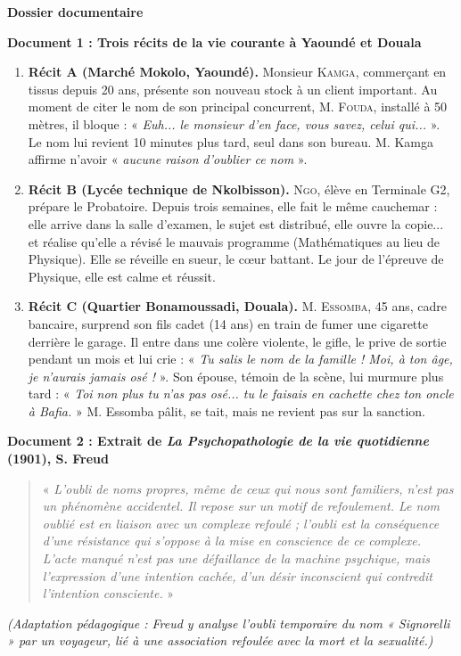 \documentclass[11pt]{article}
\begin{document}
\textbf{Dossier documentaire}

\textbf{Document 1 : Trois récits de la vie courante à Yaoundé et Douala}

\begin{enumerate}
    \item \textbf{Récit A (Marché Mokolo, Yaoundé).} Monsieur \textsc{Kamga}, commerçant en tissus depuis 20 ans, présente son nouveau stock à un client important. Au moment de citer le nom de son principal concurrent, \textsc{M. Fouda}, installé à 50 mètres, il bloque : « \emph{Euh... le monsieur d'en face, vous savez, celui qui...} ». Le nom lui revient 10 minutes plus tard, seul dans son bureau. M. Kamga affirme n'avoir « \emph{aucune raison d'oublier ce nom} ».
    \item \textbf{Récit B (Lycée technique de Nkolbisson).} \textsc{Ngo}, élève en Terminale G2, prépare le Probatoire. Depuis trois semaines, elle fait le même cauchemar : elle arrive dans la salle d'examen, le sujet est distribué, elle ouvre la copie... et réalise qu'elle a révisé le mauvais programme (Mathématiques au lieu de Physique). Elle se réveille en sueur, le cœur battant. Le jour de l'épreuve de Physique, elle est calme et réussit.
    \item \textbf{Récit C (Quartier Bonamoussadi, Douala).} \textsc{M. Essomba}, 45 ans, cadre bancaire, surprend son fils cadet (14 ans) en train de fumer une cigarette derrière le garage. Il entre dans une colère violente, le gifle, le prive de sortie pendant un mois et lui crie : « \emph{Tu salis le nom de la famille ! Moi, à ton âge, je n'aurais jamais osé !} ». Son épouse, témoin de la scène, lui murmure plus tard : « \emph{Toi non plus tu n'as pas osé... tu le faisais en cachette chez ton oncle à Bafia.} » M. Essomba pâlit, se tait, mais ne revient pas sur la sanction.
\end{enumerate}

\textbf{Document 2 : Extrait de \emph{La Psychopathologie de la vie quotidienne} (1901), S. Freud}
\begin{quote}
« \emph{L'oubli de noms propres, même de ceux qui nous sont familiers, n'est pas un phénomène accidentel. Il repose sur un motif de refoulement. Le nom oublié est en liaison avec un complexe refoulé ; l'oubli est la conséquence d'une résistance qui s'oppose à la mise en conscience de ce complexe. L'acte manqué n'est pas une défaillance de la machine psychique, mais l'expression d'une intention cachée, d'un désir inconscient qui contredit l'intention consciente.} » 
\end{quote}
\textit{(Adaptation pédagogique : Freud y analyse l'oubli temporaire du nom « Signorelli » par un voyageur, lié à une association refoulée avec la mort et la sexualité.)}
\end{document}
